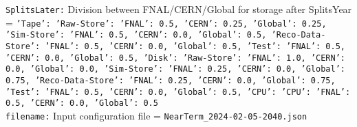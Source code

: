 {\tt SplitsLater:} Division between FNAL/CERN/Global for storage after SplitsYear = {\tt {'Tape': {'Raw-Store': {'FNAL': 0.5, 'CERN': 0.25, 'Global': 0.25}, 'Sim-Store': {'FNAL': 0.5, 'CERN': 0.0, 'Global': 0.5}, 'Reco-Data-Store': {'FNAL': 0.5, 'CERN': 0.0, 'Global': 0.5}, 'Test': {'FNAL': 0.5, 'CERN': 0.0, 'Global': 0.5}}, 'Disk': {'Raw-Store': {'FNAL': 1.0, 'CERN': 0.0, 'Global': 0.0}, 'Sim-Store': {'FNAL': 0.25, 'CERN': 0.0, 'Global': 0.75}, 'Reco-Data-Store': {'FNAL': 0.25, 'CERN': 0.0, 'Global': 0.75}, 'Test': {'FNAL': 0.5, 'CERN': 0.0, 'Global': 0.5}}, 'CPU': {'CPU': {'FNAL': 0.5, 'CERN': 0.0, 'Global': 0.5}}}} \\
{\tt filename:} Input configuration file = {\tt NearTerm\_2024-02-05-2040.json} \\

